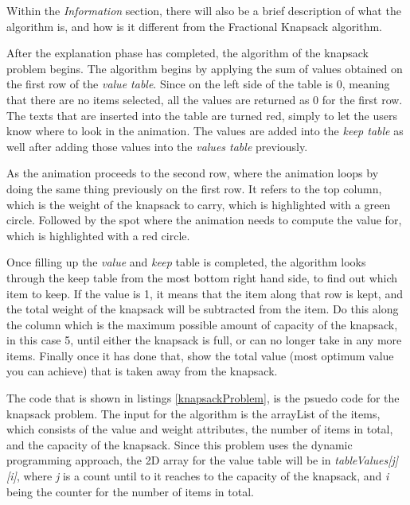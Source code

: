 Within the \textit{Information} section, there will also be a brief description of what the algorithm is, and how is it different from the Fractional Knapsack algorithm. 

After the explanation phase has completed, the algorithm of the knapsack problem begins. The algorithm begins by applying the sum of values obtained on the first row of the \textit{value table}. Since on the left side of the table is 0, meaning that there are no items selected, all the values are returned as 0 for the first row. The texts that are inserted into the table are turned red, simply to let the users know where to look in the animation. The values are added into the \textit{keep table} as well after adding those values into the \textit{values table} previously.

As the animation proceeds to the second row, where the animation loops by doing the same thing previously on the first row. It refers to the top column, which is the weight of the knapsack to carry, which is highlighted with a green circle. Followed by the spot where the animation needs to compute the value for, which is highlighted with a red circle. 

Once filling up the \textit{value} and \textit{keep} table is completed, the algorithm looks through the keep table from the most bottom right hand side, to find out which item to keep. If the value is 1, it means that the item along that row is kept, and the total weight of the knapsack will be subtracted from the item. Do this along the column which is the maximum possible amount of capacity of the knapsack, in this case 5, until either the knapsack is full, or can no longer take in any more items. Finally once it has done that, show the total value (most optimum value you can achieve) that is taken away from the knapsack.



The code that is shown in listings \ref{knapsackProblem}, is the psuedo code for the knapsack problem\cite{}. The input for the algorithm is the arrayList of the items, which consists of the value and weight attributes, the number of items in total, and the capacity of the knapsack. Since this problem uses the dynamic programming approach, the 2D array for the value table will be in \textit{tableValues[j][i]}, where \textit{j} is a count until to it reaches to the capacity of the knapsack, and \textit{i} being the counter for the number of items in total. 

